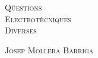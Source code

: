 \pagecolor{colorPortada}


\begin{titlepage}
   \parbox{18cm}{\fontsize{60pt}{60pt}\selectfont\color{NavyBlue}\scshape%
                 Qüestions\\[20pt] Electrotècniques\\[20pt] Diverses}

   \vspace*{3cm}
   { \begin{center}
      
   \end{center}

   \vspace*{1cm}
   \fontsize{30pt}{30pt}\selectfont\color{NavyBlue}\textsc{Josep Mollera Barriga}}
\end{titlepage}

\pagecolor{white}
